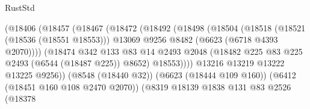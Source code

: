 \begin{lexlean}{RustStd}
\begin{coremodule}
                                          (@18406
                                            (@18457
                                              (@18467
                                                (@18472
                                                  (@18492
                                                    (@18498
                                                      (@18504
                                                        (@18518
                                                          (@18521 (@18536 (@18551 @18553)))
                                                          @13069
                                                          @9256
                                                          @8482
                                                          (@6623 (@6718 @4393 @2070))))
                                                      (@18474
                                                        @342
                                                        @133
                                                        @83
                                                        @14
                                                        @2493
                                                        @2048
                                                        (@18482
                                                          @225
                                                          @83
                                                          @225
                                                          @2493
                                                          (@6544 (@18487 @225))
                                                          @8652)
                                                        @18553))))
                                                @13216
                                                @13219
                                                @13222
                                                @13225
                                                @9256))
                                            (@8548 (@18440 @32))
                                            (@6623 (@18444 @109 @160))
                                            (@6412 (@18451 @160 @108 @2470 @2070))
                                            (@8319
                                              @18139
                                              @1838
                                              @131
                                              @83
                                              @2526
                                              (@18378

\end{coremodule}
\end{lexlean}
